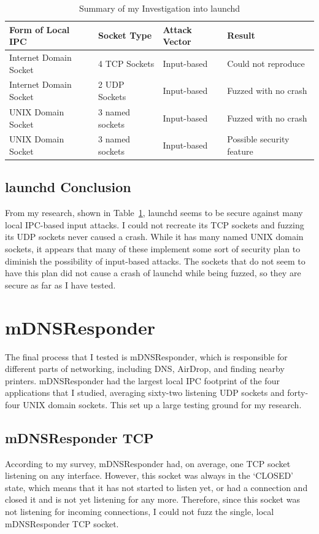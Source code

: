 \begin{table}
\centering
\begin{scriptsize}
\begin{tabular}{ l | l | l | l }
\textbf{Form of Local IPC} & \textbf{Socket Type} & \textbf{Attack Vector} & \textbf{Result} \\ \hline
Internet Domain Socket & 4 TCP Sockets & Input-based & Could not reproduce \\ \hline
Internet Domain Socket & 2 UDP Sockets & Input-based & Fuzzed with no crash \\ \hline
UNIX Domain Socket & 3 named sockets & Input-based & Fuzzed with no crash \\ \hline
UNIX Domain Socket & 3 named sockets & Input-based & Possible security feature \\ \hline
\end{tabular}
\caption{Summary of my Investigation into launchd}
\label{tab:launchdData}
\end{scriptsize}
\end{table} 

\subsection{launchd Conclusion}
\label{sec:launchdConclusion}
From my research, shown in Table~\ref{tab:launchdData}, launchd seems to be secure against many local IPC-based input attacks.  I could not recreate its TCP sockets and fuzzing its UDP sockets never caused a crash.  While it has many named UNIX domain sockets, it appears that many of these implement some sort of security plan to diminish the possibility of input-based attacks.  The sockets that do not seem to have this plan did not cause a crash of launchd while being fuzzed, so they are secure as far as I have tested.

\section{mDNSResponder}
\label{sec:mdns}
The final process that I tested is mDNSResponder, which is responsible for different parts of networking, including DNS, AirDrop, and finding nearby printers.  mDNSResponder had the largest local IPC footprint of the four applications that I studied, averaging sixty-two listening UDP sockets and forty-four UNIX domain sockets.  This set up a large testing ground for my research.

\subsection{mDNSResponder TCP}
\label{sec:mdnsTcp}
According to my survey, mDNSResponder had, on average, one TCP socket listening on any interface.  However, this socket was always in the `CLOSED' state, which means that it has not started to listen yet, or had a connection and closed it and is not yet listening for any more.  Therefore, since this socket was not listening for incoming connections, I could not fuzz the single, local mDNSResponder TCP socket.

